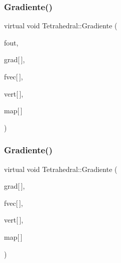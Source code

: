 \subsubsection{\texorpdfstring{Gradiente()}{Gradiente()}\hspace{0.1cm}{\footnotesize\ttfamily [2/6]}}
{\footnotesize\ttfamily virtual void Tetrahedral\+::\+Gradiente (\begin{DoxyParamCaption}\item[{F\+I\+LE $\ast$}]{fout,  }\item[{double $\ast$}]{grad\mbox{[}$\,$\mbox{]},  }\item[{const double}]{fvec\mbox{[}$\,$\mbox{]},  }\item[{const \hyperlink{structVertice}{Vertice}}]{vert\mbox{[}$\,$\mbox{]},  }\item[{const int}]{map\mbox{[}$\,$\mbox{]} }\end{DoxyParamCaption})\hspace{0.3cm}{\ttfamily [virtual]}}

\mbox{\label{classTetrahedral_a81eab285338c6b2905505749e4e1d158}} 
\subsubsection{\texorpdfstring{Gradiente()}{Gradiente()}\hspace{0.1cm}{\footnotesize\ttfamily [3/6]}}
{\footnotesize\ttfamily virtual void Tetrahedral\+::\+Gradiente (\begin{DoxyParamCaption}\item[{double $\ast$}]{grad\mbox{[}$\,$\mbox{]},  }\item[{const double}]{fvec\mbox{[}$\,$\mbox{]},  }\item[{const \hyperlink{structVertice}{Vertice}}]{vert\mbox{[}$\,$\mbox{]},  }\item[{const int}]{map\mbox{[}$\,$\mbox{]} }\end{DoxyParamCaption})\hspace{0.3cm}{\ttfamily [virtual]}}

\mbox{\label{classStdel_af3e65d1ad0d59ded925a3f5a9d0fb100}} 
